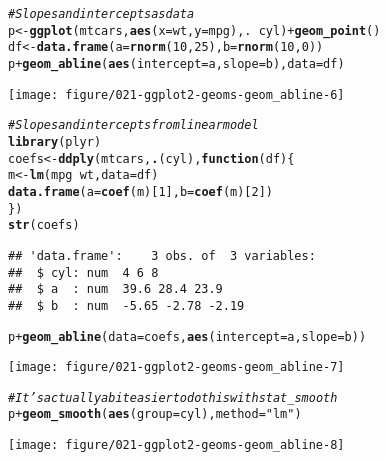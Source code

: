 \documentclass[a4paper,titlepage]{tufte-handout}\usepackage[]{graphicx}\usepackage[]{color}
\makeatletter
\def\maxwidth{ %
  \ifdim\Gin@nat@width>\linewidth
    \linewidth
  \else
    \Gin@nat@width
  \fi
}
\newcommand{\hlnum}[1]{\textcolor[rgb]{0.686,0.059,0.569}{#1}}%
\newcommand{\hlstr}[1]{\textcolor[rgb]{0.192,0.494,0.8}{#1}}%
\newcommand{\hlcom}[1]{\textcolor[rgb]{0.678,0.584,0.686}{\textit{#1}}}%
\newcommand{\hlopt}[1]{\textcolor[rgb]{0,0,0}{#1}}%
\newcommand{\hlstd}[1]{\textcolor[rgb]{0.345,0.345,0.345}{#1}}%
\newcommand{\hlkwa}[1]{\textcolor[rgb]{0.161,0.373,0.58}{\textbf{#1}}}%
\newcommand{\hlkwb}[1]{\textcolor[rgb]{0.69,0.353,0.396}{#1}}%
\newcommand{\hlkwc}[1]{\textcolor[rgb]{0.333,0.667,0.333}{#1}}%
\newcommand{\hlkwd}[1]{\textcolor[rgb]{0.737,0.353,0.396}{\textbf{#1}}}%
\newenvironment{kframe}{%
 \def\at@end@of@kframe{}%
 \ifinner\ifhmode%
  \def\at@end@of@kframe{\end{minipage}}%
  \begin{minipage}{\columnwidth}%
 \fi\fi%
 \def\FrameCommand##1{\hskip\@totalleftmargin \hskip-\fboxsep
 \colorbox{shadecolor}{##1}\hskip-\fboxsep
     \hskip-\linewidth \hskip-\@totalleftmargin \hskip\columnwidth}%
 \MakeFramed {\advance\hsize-\width
   \@totalleftmargin\z@ \linewidth\hsize
   \@setminipage}}%
 {\par\unskip\endMakeFramed%
 \at@end@of@kframe}
\newenvironment{knitrout}{}{} %
\makeatother
\begin{document}
\begin{knitrout}
\begin{kframe}
\begin{alltt}
\hlcom{# Slopes and intercepts as data}
\hlstd{p} \hlkwb{<-} \hlkwd{ggplot}\hlstd{(mtcars,} \hlkwd{aes}\hlstd{(}\hlkwc{x} \hlstd{= wt,} \hlkwc{y}\hlstd{=mpg), .} \hlopt{~} \hlstd{cyl)} \hlopt{+} \hlkwd{geom_point}\hlstd{()}
\hlstd{df} \hlkwb{<-} \hlkwd{data.frame}\hlstd{(}\hlkwc{a}\hlstd{=}\hlkwd{rnorm}\hlstd{(}\hlnum{10}\hlstd{,} \hlnum{25}\hlstd{),} \hlkwc{b}\hlstd{=}\hlkwd{rnorm}\hlstd{(}\hlnum{10}\hlstd{,} \hlnum{0}\hlstd{))}
\hlstd{p} \hlopt{+} \hlkwd{geom_abline}\hlstd{(}\hlkwd{aes}\hlstd{(}\hlkwc{intercept}\hlstd{=a,} \hlkwc{slope}\hlstd{=b),} \hlkwc{data}\hlstd{=df)}
\end{alltt}
\end{kframe}
\texttt{[image: figure/021-ggplot2-geoms-geom\_abline-6]} 
\begin{kframe}\begin{alltt}
\hlcom{# Slopes and intercepts from linear model}
\hlkwd{library}\hlstd{(plyr)}
\hlstd{coefs} \hlkwb{<-} \hlkwd{ddply}\hlstd{(mtcars,} \hlkwd{.}\hlstd{(cyl),} \hlkwa{function}\hlstd{(}\hlkwc{df}\hlstd{) \{}
  \hlstd{m} \hlkwb{<-} \hlkwd{lm}\hlstd{(mpg} \hlopt{~} \hlstd{wt,} \hlkwc{data}\hlstd{=df)}
  \hlkwd{data.frame}\hlstd{(}\hlkwc{a} \hlstd{=} \hlkwd{coef}\hlstd{(m)[}\hlnum{1}\hlstd{],} \hlkwc{b} \hlstd{=} \hlkwd{coef}\hlstd{(m)[}\hlnum{2}\hlstd{])}
\hlstd{\})}
\hlkwd{str}\hlstd{(coefs)}
\end{alltt}
\begin{verbatim}
## 'data.frame':	3 obs. of  3 variables:
##  $ cyl: num  4 6 8
##  $ a  : num  39.6 28.4 23.9
##  $ b  : num  -5.65 -2.78 -2.19
\end{verbatim}
\begin{alltt}
\hlstd{p} \hlopt{+} \hlkwd{geom_abline}\hlstd{(}\hlkwc{data}\hlstd{=coefs,} \hlkwd{aes}\hlstd{(}\hlkwc{intercept}\hlstd{=a,} \hlkwc{slope}\hlstd{=b))}
\end{alltt}
\end{kframe}
\texttt{[image: figure/021-ggplot2-geoms-geom\_abline-7]} 
\begin{kframe}\begin{alltt}
\hlcom{# It's actually a bit easier to do this with stat_smooth}
\hlstd{p} \hlopt{+} \hlkwd{geom_smooth}\hlstd{(}\hlkwd{aes}\hlstd{(}\hlkwc{group}\hlstd{=cyl),} \hlkwc{method}\hlstd{=}\hlstr{"lm"}\hlstd{)}
\end{alltt}
\end{kframe}
\texttt{[image: figure/021-ggplot2-geoms-geom\_abline-8]} 
\begin{kframe}\begin{alltt}

\end{alltt}
\end{kframe}
\end{knitrout}
\end{document}

